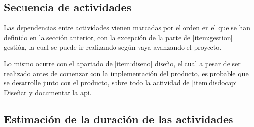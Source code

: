 \subsection{Secuencia de actividades}
Las dependencias entre actividades vienen marcadas por el orden en el que se
han definido en la sección anterior, con la excepción de la parte de
\ref{item:gestion} gestión, la cual se puede ir realizando según vaya avanzando
el proyecto.

Lo mismo ocurre con el apartado de \ref{item:diseno} diseño, el cual a pesar
de ser realizado antes de comenzar con la implementación del producto, es
probable que se desarrolle junto con el producto, sobre todo la actividad de
\ref{item:disdocapi} Diseñar y documentar la \gls{api}.

\subsection{Estimación de la duración de las actividades}

